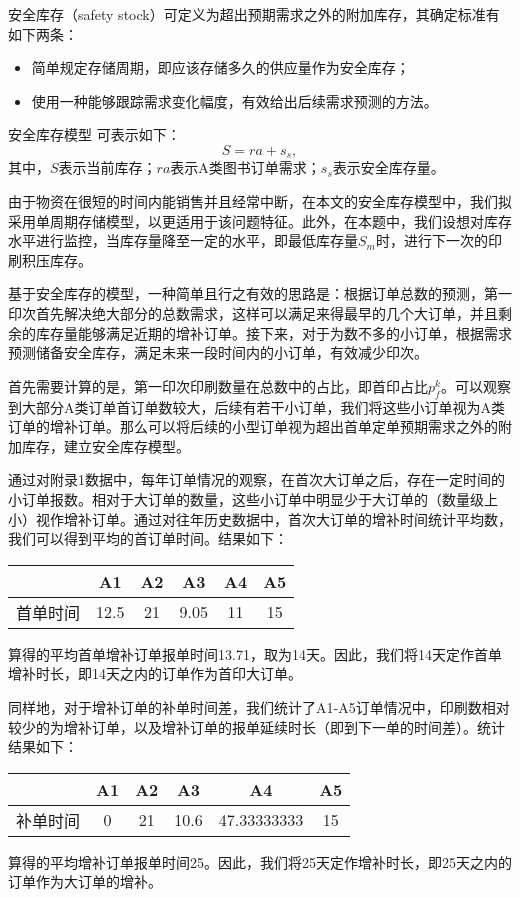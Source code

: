 \documentclass[bwprint]{gmcmthesis}
\begin{document}
安全库存（safety stock）可定义为超出预期需求之外的附加库存，其确定标准有如下两条：
\begin{itemize}
  \item 简单规定存储周期，即应该存储多久的供应量作为安全库存；
  \item 使用一种能够跟踪需求变化幅度，有效给出后续需求预测的方法。
\end{itemize}

安全库存模型 可表示如下：
\begin{equation}
\label{eq:S}
  S = ra + s_s,
\end{equation}
其中，$S$表示当前库存；$ra$表示A类图书订单需求；$s_s$表示安全库存量。

由于物资在很短的时间内能销售并且经常中断，在本文的安全库存模型中，我们拟采用单周期存储模型，以更适用于该问题特征。此外，在本题中，我们设想对库存水平进行监控，当库存量降至一定的水平，即最低库存量$S_m$时，进行下一次的印刷积压库存。

基于安全库存的模型，一种简单且行之有效的思路是：根据订单总数的预测，第一印次首先解决绝大部分的总数需求，这样可以满足来得最早的几个大订单，并且剩余的库存量能够满足近期的增补订单。接下来，对于为数不多的小订单，根据需求预测储备安全库存，满足未来一段时间内的小订单，有效减少印次。

首先需要计算的是，第一印次印刷数量在总数中的占比，即首印占比$p^k_f$。可以观察到大部分A类订单首订单数较大，后续有若干小订单，我们将这些小订单视为A类订单的增补订单。那么可以将后续的小型订单视为超出首单定单预期需求之外的附加库存，建立安全库存模型。

通过对附录1数据中，每年订单情况的观察，在首次大订单之后，存在一定时间的小订单报数。相对于大订单的数量，这些小订单中明显少于大订单的（数量级上小）视作增补订单。通过对往年历史数据中，首次大订单的增补时间统计平均数，我们可以得到平均的首订单时间。结果如下：
\begin{table}[H]
\centering
\begin{tabular}{cccccc}
  & A1 & A2 & A3 & A4 & A5\\
\hline
首单时间 & 12.5 & 21 & 9.05 & 11 & 15
\end{tabular}
\end{table}
算得的平均首单增补订单报单时间13.71，取为14天。因此，我们将14天定作首单增补时长，即14天之内的订单作为首印大订单。

同样地，对于增补订单的补单时间差，我们统计了A1-A5订单情况中，印刷数相对较少的为增补订单，以及增补订单的报单延续时长（即到下一单的时间差）。统计结果如下：
\begin{table}[H]
\centering
\begin{tabular}{cccccc}
  & A1 & A2 & A3 & A4 & A5\\
\hline
补单时间 & 0 & 21 & 10.6 & 47.33333333 & 15
\end{tabular}
\end{table}
算得的平均增补订单报单时间25。因此，我们将25天定作增补时长，即25天之内的订单作为大订单的增补。
\end{document}
